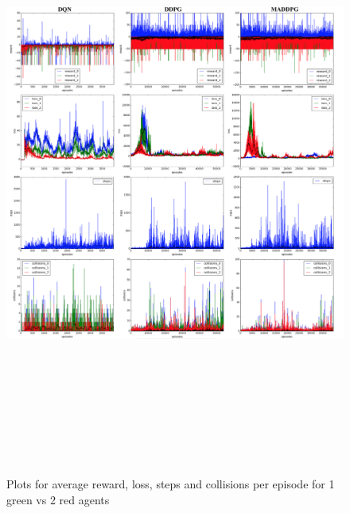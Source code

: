 \begin{figure}[htbp]
    \vspace*{-3.5cm}
    \hspace*{-3.5cm}
    \includegraphics[width=21cm, height=20cm]{2vs1}
	\caption{Plots for average reward, loss, steps and collisions per episode for 1 green vs 2 red agents}\label{Figure 4}
\end{figure}

